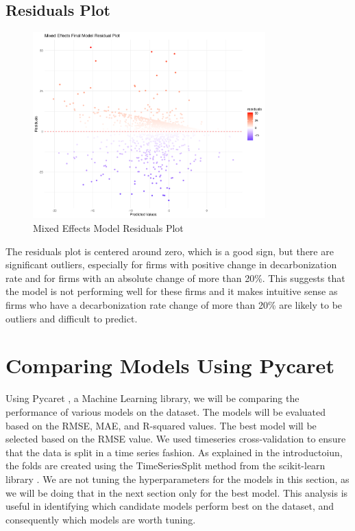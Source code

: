 \subsection{Residuals Plot}
\begin{figure}[H]
    \centering
    \includegraphics[width=0.8\textwidth]{figures/final_model_residuals.png}
    \caption{Mixed Effects Model Residuals Plot}
    \label{fig:mixed_effects_residuals}
\end{figure}
\noindent The residuals plot is centered around zero, which is a good sign, but there are significant outliers, especially for firms with positive change in decarbonization rate and for firms with an absolute change of more than 20\%. This suggests that the model is not performing well for these firms and it makes intuitive sense as firms who have a decarbonization rate change of more than 20\% are likely to be outliers and difficult to predict.

\section{Comparing Models Using Pycaret}
Using Pycaret \cite{pycaret}, a Machine Learning library, we will be comparing the performance of various models on the dataset. The models will be evaluated based on the RMSE, MAE, and R-squared values. The best model will be selected based on the RMSE value. We used timeseries cross-validation to ensure that the data is split in a time series fashion. As explained in the introductoiun, the folds are created using the TimeSeriesSplit method from the scikit-learn library \cite{scikit-learn}. We are not tuning the hyperparameters for the models in this section, as we will be doing that in the next section only for the best model. This analysis is useful in identifying which candidate models perform best on the dataset, and consequently which models are worth tuning.


